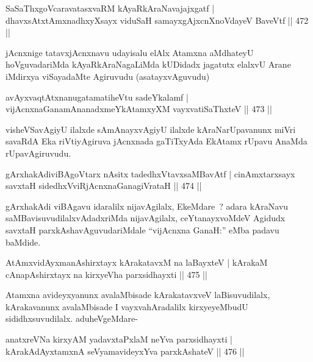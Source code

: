 \begin{shl}
SaSaThxgoVcaravatasxvaRM kAyaRkAraNavajajxgatf |
dhavxsAtxtAmxnadhxyXsayx viduSaH samayxgAjxcnXnoVdayeV BaveVtf \hfill || 472 ||
\end{shl}

\begin{artha}
jAcnxnige tatavxjAcnxnavu udayisalu elAlx Atamxna aMdhateyU
hoVguvadariMda kAyaRkAraNagaLiMda kUDidadx jagatutx elalxvU Arane
iMdirxya viSayadaMte Agiruvudu (asatayxvAguvudu)
\end{artha}

\begin{shl}
avAyxvaqtAtxnanugatamatiheVtu sadeYkalamf |
vijAcnxnaGanamAnanadxmeYkAtamxyXM vayxvatiSaThxteV \hfill || 473 ||
\end{shl}

\begin{artha}
visheVSavAgiyU ilalxde sAmAnayxvAgiyU ilalxde kAraNarUpavanunx miVri savaRdA Eka riVtiyAgiruva jAcnxnada gaTiTxyAda EkAtamx rUpavu AnaMda rUpavAgiruvudu.
\end{artha}

\begin{shl}
gArxhakAdiviBAgoV\s tarx nAsitx tadedhxVtavxsaMBavAtf |
cinAmxtarxsayx savxtaH sidedhxVviRjAcnxnaGanagiVrataH \hfill || 474 ||
\end{shl}

\begin{artha}
gArxhakAdi viBAgavu idaralilx nijavAgilalx, EkeMdare~? adara kAraNavu saMBavisuvudilalxvAdadxriMda nijavAgilalx, ceYtanayxvoMdeV Agidudx savxtaH parxkAshavAguvudariMdale ``vijAcnxna GanaH:'' eMba padavu baMdide.
\end{artha}

\begin{shl}
AtAmxvidAyxmanAshirxtayx kArakatavxM na laBayxteV |
kArakaM cAnapAshirxtayx na kirxyeVha parxsidhayxti \hfill || 475 ||
\end{shl}

\begin{artha}
Atamxna avideyxyanunx avalaMbisade kArakatavxveV laBisuvudilalx,
kArakavanunx avalaMbisade I vayxvahAradalilx kirxyeyeMbudU
sididhxsuvudilalx. adu\break heVgeMdare-
\end{artha}

\begin{shl}
anatxreVNa kirxyAM yadavxtaPxlaM neYva parxsidhayxti |
kArakAdAyxtamxnA seVyamavideyxYva parxkAshateV \hfill || 476 ||
\end{shl}

